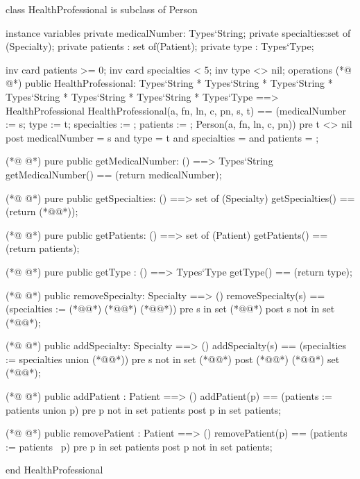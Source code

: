 \begin{vdmpp}[breaklines=true]
class HealthProfessional is subclass of Person

instance variables
  private medicalNumber: Types`String;
  private specialties:set of (Specialty);
  private patients : set of(Patient);
 private type : Types`Type;
 
 inv card patients >= 0;
  inv card specialties < 5;
 inv type <> nil;
operations
(*@
\label{HealthProfessional:13}
@*)
 public HealthProfessional: Types`String * Types`String * Types`String * Types`String * Types`String * Types`String * Types`Type ==> HealthProfessional
  HealthProfessional(a, fn, ln, c, pn, s, t) == (medicalNumber := s; type := t; specialties := {}; patients := {}; Person(a, fn, ln, c, pn))
 pre t <> nil
 post medicalNumber = s and type = t and specialties = {} and patients = {};
 
(*@
\label{getMedicalNumber:18}
@*)
 pure public getMedicalNumber: () ==> Types`String
  getMedicalNumber() == (return medicalNumber);
 
(*@
\label{getSpecialties:21}
@*)
 pure public getSpecialties: () ==> set of (Specialty)
  getSpecialties() == (return (*@@*));
 
(*@
\label{getPatients:24}
@*)
 pure public getPatients: () ==> set of (Patient)
  getPatients() == (return patients);
  
(*@
\label{getType:27}
@*)
 pure public getType : () ==> Types`Type
  getType() == (return type);
  
(*@
\label{removeSpecialty:30}
@*)
 public removeSpecialty: Specialty ==> ()
  removeSpecialty(s) == (specialties := (*@@*) (*@\vdmnotcovered{\textbackslash }@*) {(*@@*)})
 pre s in set (*@@*)
 post s not in set (*@@*);
  
(*@
\label{addSpecialty:35}
@*)
 public addSpecialty: Specialty ==> ()
  addSpecialty(s) == (specialties := specialties union {(*@@*)})
 pre s not in set (*@@*)
 post (*@@*) (*@@*) set (*@@*);
 
(*@
\label{addPatient:40}
@*)
 public addPatient : Patient ==> ()
  addPatient(p) == (patients :=  patients union {p})
 pre p not in set patients
 post p in set patients;
 
(*@
\label{removePatient:45}
@*)
 public removePatient : Patient ==> ()
  removePatient(p) == (patients := patients \ {p})
 pre p in set patients
 post p not in set patients;

end HealthProfessional
\end{vdmpp}
